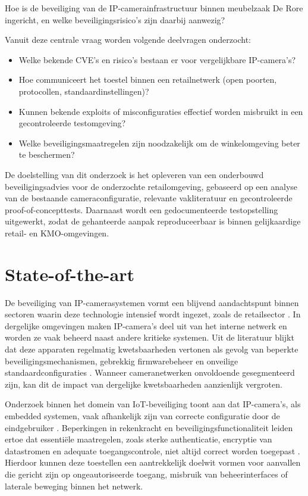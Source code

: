 Hoe is de beveiliging van de \newline IP-camerainfrastructuur binnen meubelzaak De Rore ingericht, 
en welke beveiligingsrisico’s zijn daarbij aanwezig?


Vanuit deze centrale vraag worden volgende deelvragen onderzocht:
\begin{itemize}
    \item Welke bekende CVE’s en risico’s bestaan er voor vergelijkbare IP-camera’s?
    \item Hoe communiceert het toestel binnen een retailnetwerk (open poorten, protocollen, standaardinstellingen)?
    \item Kunnen bekende exploits of misconfiguraties effectief worden misbruikt in een gecontroleerde testomgeving?
    \item Welke beveiligingsmaatregelen zijn noodzakelijk om de winkelomgeving beter te beschermen?
\end{itemize}

De doelstelling van dit onderzoek is het opleveren van een onderbouwd beveiligingsadvies voor de onderzochte retailomgeving, 
gebaseerd op een analyse van de bestaande cameraconfiguratie, relevante vakliteratuur en gecontroleerde proof-of-concepttests. 
Daarnaast wordt een gedocumenteerde testopstelling uitgewerkt, zodat de gehanteerde aanpak reproduceerbaar is binnen gelijkaardige retail- en KMO-omgevingen.

\section{State-of-the-art}

De beveiliging van IP-camerasystemen vormt een blijvend aandachtspunt binnen sectoren waarin deze technologie intensief wordt ingezet, zoals de retailsector \parencite{ENISA2024ThreatLandscape}. In dergelijke omgevingen maken IP-camera’s deel uit van het interne netwerk en worden ze vaak beheerd naast andere kritieke systemen. Uit de literatuur blijkt dat deze apparaten regelmatig kwetsbaarheden vertonen als gevolg van beperkte beveiligingsmechanismen, gebrekkig firmwarebeheer en onveilige standaardconfiguraties \parencite{Butun2019arXivIoTSecurity}. Wanneer cameranetwerken onvoldoende gesegmenteerd zijn, kan dit de impact van dergelijke kwetsbaarheden aanzienlijk vergroten.

Onderzoek binnen het domein van IoT-beveiliging toont aan dat IP-camera’s, als embedded systemen, vaak afhankelijk zijn van correcte configuratie door de eindgebruiker \parencite{Butun2019arXivIoTSecurity}. Beperkingen in rekenkracht en beveiligingsfunctionaliteit leiden ertoe dat essentiële maatregelen, zoals sterke authenticatie, encryptie van datastromen en adequate toegangscontrole, niet altijd correct worden toegepast \parencite{Butun2019arXivIoTSecurity}. Hierdoor kunnen deze toestellen een aantrekkelijk doelwit vormen voor aanvallen die gericht zijn op ongeautoriseerde toegang, misbruik van beheerinterfaces of laterale beweging binnen het netwerk.

